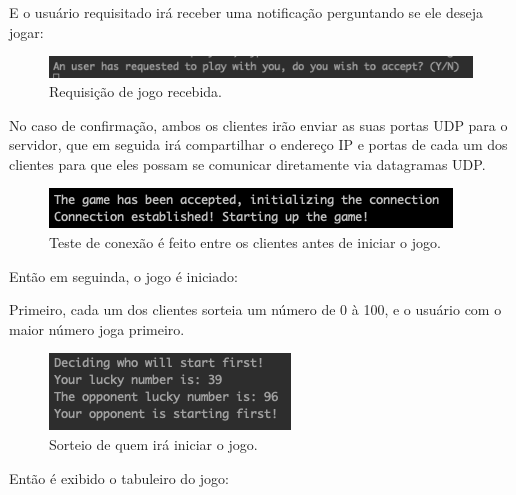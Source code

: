 \documentclass[12pt,a4paper]{report}
\begin{document}
E o usuário requisitado irá receber uma notificação perguntando se ele deseja jogar:

\begin{figure}[H]
    \includegraphics[width=\linewidth]{request_received.png}
    \caption{Requisição de jogo recebida.}
\end{figure}

\bigbreak

No caso de confirmação, ambos os clientes irão enviar as suas portas UDP para o servidor, que em seguida irá compartilhar o endereço IP e portas de cada um dos clientes para que eles possam se comunicar diretamente via datagramas UDP.

\begin{figure}[H]
    \includegraphics[width=\linewidth]{udp_connection.png}
    \caption{Teste de conexão é feito entre os clientes antes de iniciar o jogo.}
\end{figure}

\bigbreak

Então em seguinda, o jogo é iniciado:

\bigbreak

Primeiro, cada um dos clientes sorteia um número de 0 à 100, e o usuário com o maior número joga primeiro.

\begin{figure}[H]
    \includegraphics[width=\linewidth]{lucky_number.png}
    \caption{Sorteio de quem irá iniciar o jogo.}
\end{figure}

\bigbreak

Então é exibido o tabuleiro do jogo:
\end{document}

